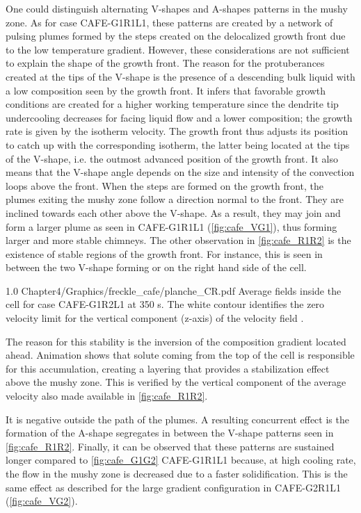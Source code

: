 One could distinguish alternating V-shapes and A-shapes patterns in the mushy zone. 
As for case CAFE-G1R1L1, these patterns are created by a network of pulsing 
plumes formed by the steps created on the delocalized growth front due to the low temperature gradient. However, these 
considerations are not sufficient to explain the shape of the growth front. The reason for the protuberances created at 
the tips of the V-shape is the presence of a descending bulk liquid with a low composition seen by the growth front. It 
infers that favorable growth conditions are created for a higher working temperature since the dendrite tip undercooling 
decreases for facing liquid flow and a lower composition; the growth rate is given by the isotherm velocity. The growth 
front thus adjusts its position to catch up with the corresponding isotherm, the latter being located at the tips of the 
V-shape, i.e. the outmost advanced position of the growth front. It also means that the V-shape angle depends on the size 
and intensity of the convection loops above the front. When the steps are formed on the growth front, the plumes exiting 
the mushy zone follow a direction normal to the front. They are inclined towards each other above the V-shape. As a result, 
they may join and form a larger plume as seen in CAFE-G1R1L1 (\cref{fig:cafe_VG1}), thus forming larger and more stable chimneys. 
The other observation in \cref{fig:cafe_R1R2} is the existence of stable regions of the growth front. For instance, this is seen 
in between the two V-shape forming or on the right hand side of the cell. 

\begin{figureth}
{1.0}
{Chapter4/Graphics/freckle_cafe/planche_CR.pdf}
{Average fields inside the cell for case CAFE-G1R2L1 at 350 s. 
The white contour identifies the zero velocity limit for the vertical component (z-axis) of the velocity field .}
\label{fig:cafe_R1R2}
\end{figureth}

The reason for this stability is the inversion of 
the composition gradient located ahead. Animation shows that solute coming from the top of the cell is responsible for this 
accumulation, creating a layering that provides a stabilization effect above the mushy zone. This is verified by the vertical 
component of the average velocity also made available in \cref{fig:cafe_R1R2}. 

It is negative outside the path of the plumes. A resulting 
concurrent effect is the formation of the A-shape segregates in between the V-shape patterns seen in \cref{fig:cafe_R1R2}. Finally, it can 
be observed that these patterns are sustained longer compared to \cref{fig:cafe_G1G2} CAFE-G1R1L1 because, at high cooling rate, 
the flow in the mushy zone is decreased due to a faster solidification. This is the same effect as described for the large gradient 
configuration in CAFE-G2R1L1 (\cref{fig:cafe_VG2}).

